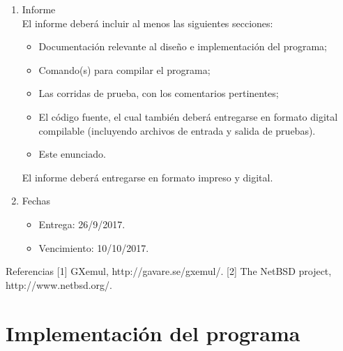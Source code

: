 \documentclass[a4paper,10pt]{article}
\begin{document}
\begin{enumerate}
\item Informe \\
El informe deberá incluir al menos las siguientes secciones:
\begin{itemize}
\item Documentación relevante al diseño e implementación del programa;
\item Comando(s) para compilar el programa;
\item Las corridas de prueba, con los comentarios pertinentes;
\item El código fuente, el cual también deberá entregarse en formato digital compilable (incluyendo archivos de entrada y salida de pruebas).
\item Este enunciado.
\end{itemize}
El informe deberá entregarse en formato impreso y digital.

\item Fechas
\begin{itemize}
\item Entrega: 26/9/2017.
\item Vencimiento: 10/10/2017.
\end{itemize}
\end{enumerate}

Referencias \vspace{1cm}
[1] GXemul, http://gavare.se/gxemul/.
[2] The NetBSD project, http://www.netbsd.org/.

\newpage

\section{Implementación del programa}
\end{document}
